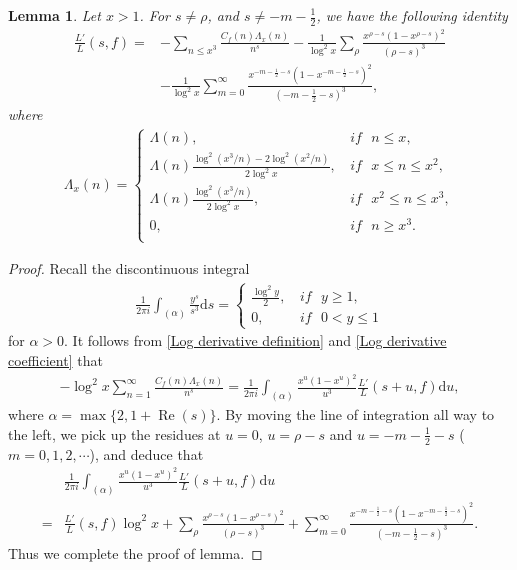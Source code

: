 \documentclass[10pt,a4paper]{amsart}
\newtheorem{lemma}{Lemma}
\renewcommand{\Re}{\operatorname{Re}}
\newcommand{\bna}{\begin{eqnarray*}}
\newcommand{\ena}{\end{eqnarray*}}
\begin{document}
\begin{lemma}
Let $x>1$. For $s\neq \rho$, and $s\neq -m-\frac{1}{2}$, we have the following identity
\begin{equation*}
\begin{split}
\frac{L'}{L}(s,f)=&-\sum_{n\leq x^3} \frac{C_f(n)\Lambda_x(n)}{n^s}
-\frac{1}{\log^2x}\sum_\rho\frac{x^{\rho-s}(1-x^{\rho-s})^2}{(\rho-s)^3}\\
&-\frac{1}{\log^2x}\sum_{m=0}^\infty\frac{x^{-m-\frac{1}{2}-s}(1-x^{-m-\frac{1}{2}-s})^2}{(-m-\frac{1}{2}-s)^3},
\end{split}
\end{equation*}
where
\bna
\Lambda_x(n)=\begin{cases}
\Lambda(n), \,&\textit{if }\,\,n\leq x,\\
\Lambda(n)\frac{\log^2(x^3/n)-2\log^2(x^2/n)}{2\log^2x}, \,& \textit{if }\,\,x\leq n\leq x^2,\\
\Lambda(n)\frac{\log^2(x^3/n)}{2\log^2x}, \,& \textit{if }\,\,x^2\leq n\leq x^3,\\
0, \,& \textit{if }\,\,n\geq x^3.\\
\end{cases}
\ena
\end{lemma}

\begin{proof}
Recall the discontinuous integral
\bna
\frac{1}{2\pi i}\int_{(\alpha)}\frac{y^s}{s^3}\mathrm{d}s=
\begin{cases}
\frac{\log^2 y}{2}, \,&\textit{if }\,\, y\geq 1,\\
0, \,& \textit{if }\,\, 0<y\leq 1
\end{cases}
\ena
for $\alpha>0$.
It follows from \eqref{Log derivative definition} and \eqref{Log derivative coefficient} that
\bna
-\log^2x\sum_{n=1}^\infty \frac{C_f(n)\Lambda_x(n)}{n^s}=
\frac{1}{2\pi i}\int_{(\alpha)}\frac{x^u(1-x^u)^2}{u^3}\frac{L'}{L}(s+u,f)\mathrm{d}u,
\ena
where $\alpha=\max \{2, 1+\Re(s)\}$. By moving the line of integration all way to the left, we
pick up the residues at $u=0$, $u=\rho-s$ and $u=-m-\frac{1}{2}-s$ ($m= 0,1,2, \cdots$), and deduce that
\begin{equation*}
\begin{split}
&\frac{1}{2\pi i}\int_{(\alpha)}\frac{x^u(1-x^u)^2}{u^3}\frac{L'}{L}(s+u,f)\mathrm{d}u\\
=&\frac{L'}{L}(s,f)\log^2x+\sum_\rho\frac{x^{\rho-s}(1-x^{\rho-s})^2}{(\rho-s)^3}
+\sum_{m=0}^\infty\frac{x^{-m-\frac{1}{2}-s}(1-x^{-m-\frac{1}{2}-s})^2}{(-m-\frac{1}{2}-s)^3}.
\end{split}
\end{equation*}
Thus we complete the proof of lemma.
\end{proof}
\end{document}
